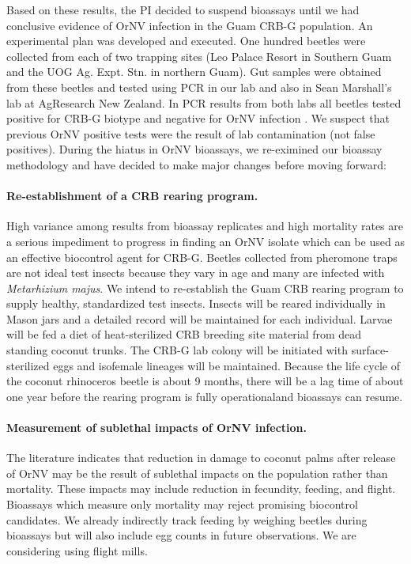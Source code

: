\documentclass[12pt,letterpaper,english,bibliography=totocnumbered,abstract=on]{scrartcl}
\begin{document}
Based on these results, the PI decided to suspend bioassays until we had conclusive evidence of OrNV infection in the Guam CRB-G population. An experimental plan \cite{mooreExperimentalPlanDetermining2020} was
developed and executed. One hundred beetles were collected from each of two trapping sites
(Leo Palace Resort in Southern Guam and the UOG Ag. Expt. Stn. in northern Guam).
Gut samples were obtained from these beetles and tested using PCR in our lab and also in
Sean Marshall's lab at AgResearch New Zealand. In PCR results from both labs all beetles tested positive for CRB-G biotype and negative for OrNV infection \cite{graselaInvestigationDeterminePresence2020}. We suspect that
previous OrNV positive tests were the result of lab contamination (not false positives).
During the hiatus in OrNV bioassays, we re-eximined our bioassay methodology and have
decided to make major changes before moving forward:

\paragraph{Re-establishment of a CRB rearing program.} High variance among results from bioassay
replicates and high mortality rates are a serious impediment to progress in finding an
OrNV isolate which can be used as an effective biocontrol agent for CRB-G. Beetles
collected from pheromone traps are not ideal test insects because they vary in age and
many are infected with \textit{Metarhizium majus}.
We intend to re-establish the Guam CRB rearing program to supply healthy, standardized test insects. Insects will be reared individually in Mason jars and a detailed record
will be maintained for each individual. Larvae will be fed a diet of heat-sterilized CRB
breeding site material from dead standing coconut trunks. The CRB-G lab colony will
be initiated with surface-sterilized eggs and isofemale lineages will be maintained.
Because the life cycle of the coconut rhinoceros beetle is about 9 months, there will
be a lag time of about one year before the rearing program is fully operationaland
bioassays can resume.

\paragraph{Measurement of sublethal impacts of OrNV infection.} The literature indicates
that reduction in damage to coconut palms after release of OrNV may be the result of
sublethal impacts on the population rather than mortality. These impacts may include
reduction in fecundity, feeding, and flight. Bioassays which measure only mortality may
reject promising biocontrol candidates.
We already indirectly track feeding by weighing beetles during bioassays but will also
include egg counts in future observations. We are considering using flight mills.
\end{document}
